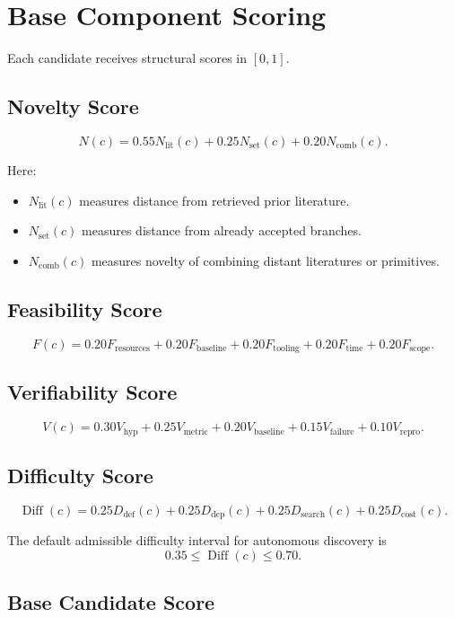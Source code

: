 \documentclass[11pt]{article}
\begin{document}
\section{Base Component Scoring}

Each candidate receives structural scores in $[0,1]$.

\subsection{Novelty Score}

$$
N(c) = 0.55N_{\text{lit}}(c) + 0.25N_{\text{set}}(c) + 0.20N_{\text{comb}}(c).
$$

Here:
\begin{itemize}[leftmargin=*]
\item $N_{\text{lit}}(c)$ measures distance from retrieved prior literature.
\item $N_{\text{set}}(c)$ measures distance from already accepted branches.
\item $N_{\text{comb}}(c)$ measures novelty of combining distant literatures or primitives.
\end{itemize}

\subsection{Feasibility Score}

$$
F(c) = 0.20F_{\text{resources}} + 0.20F_{\text{baseline}} + 0.20F_{\text{tooling}} + 0.20F_{\text{time}} + 0.20F_{\text{scope}}.
$$

\subsection{Verifiability Score}

$$
V(c) = 0.30V_{\text{hyp}} + 0.25V_{\text{metric}} + 0.20V_{\text{baseline}} + 0.15V_{\text{failure}} + 0.10V_{\text{repro}}.
$$

\subsection{Difficulty Score}

$$
\operatorname{Diff}(c) = 0.25D_{\text{def}}(c) + 0.25D_{\text{dep}}(c) + 0.25D_{\text{search}}(c) + 0.25D_{\text{cost}}(c).
$$

The default admissible difficulty interval for autonomous discovery is
$$
0.35\leq \operatorname{Diff}(c)\leq 0.70.
$$

\subsection{Base Candidate Score}
\end{document}
